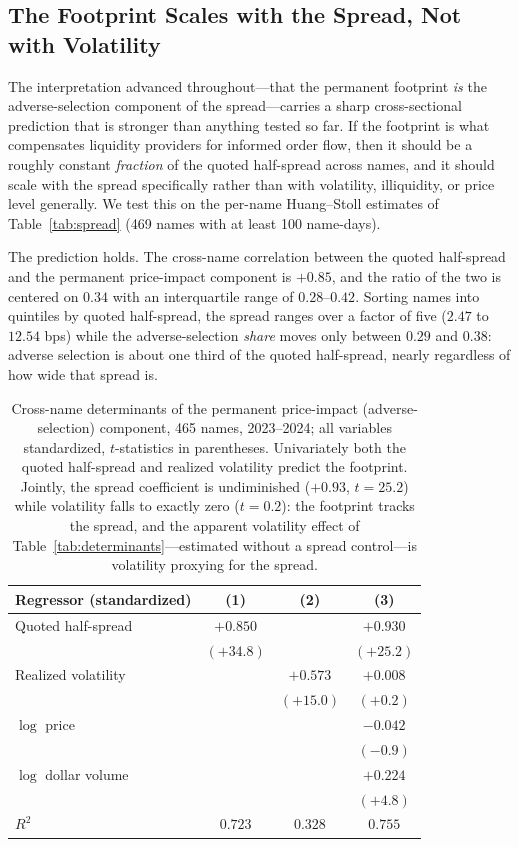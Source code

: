 \documentclass[11pt]{article}
\begin{document}
\subsection{The Footprint Scales with the Spread, Not with Volatility}
\label{sub:scaling}

The interpretation advanced throughout---that the permanent footprint \emph{is} the
adverse-selection component of the spread---carries a sharp cross-sectional prediction that
is stronger than anything tested so far. If the footprint is what compensates liquidity
providers for informed order flow, then it should be a roughly constant \emph{fraction} of
the quoted half-spread across names, and it should scale with the spread specifically
rather than with volatility, illiquidity, or price level generally. We test this on the
per-name Huang--Stoll estimates of Table~\ref{tab:spread} (469 names with at least 100
name-days).

The prediction holds. The cross-name correlation between the quoted half-spread and the
permanent price-impact component is $+0.85$, and the ratio of the two is centered on
$0.34$ with an interquartile range of $0.28$--$0.42$. Sorting names into quintiles by
quoted half-spread, the spread ranges over a factor of five ($2.47$ to $12.54$ bps) while
the adverse-selection \emph{share} moves only between $0.29$ and $0.38$: adverse selection
is about one third of the quoted half-spread, nearly regardless of how wide that spread is.

\begin{table}[htbp]
\centering
\begin{tabular}{lccc}
\toprule
\textbf{Regressor (standardized)} & \textbf{(1)} & \textbf{(2)} & \textbf{(3)} \\
\midrule
Quoted half-spread & $+0.850$ & & $+0.930$ \\
                   & $(+34.8)$ & & $(+25.2)$ \\
Realized volatility & & $+0.573$ & $+0.008$ \\
                    & & $(+15.0)$ & $(+0.2)$ \\
$\log$ price & & & $-0.042$ \\
             & & & $(-0.9)$ \\
$\log$ dollar volume & & & $+0.224$ \\
                     & & & $(+4.8)$ \\
\midrule
$R^2$ & $0.723$ & $0.328$ & $0.755$ \\
\bottomrule
\end{tabular}
\caption{Cross-name determinants of the permanent price-impact (adverse-selection)
component, 465 names, 2023--2024; all variables standardized, $t$-statistics in
parentheses. Univariately both the quoted half-spread and realized volatility predict the
footprint. Jointly, the spread coefficient is undiminished ($+0.93$, $t=25.2$) while
volatility falls to exactly zero ($t=0.2$): the footprint tracks the spread, and the
apparent volatility effect of Table~\ref{tab:determinants}---estimated without a spread
control---is volatility proxying for the spread.}
\label{tab:scaling}
\end{table}
\end{document}
